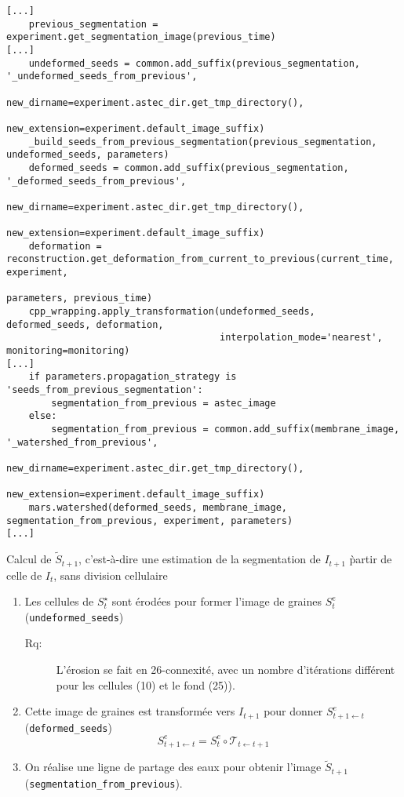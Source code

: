 \documentclass{article}
\def \mycolor {red}
\newenvironment{remarque}{\color{red}\begin{description}\item[Rq:]}
{\end{description}\color{black}}
\begin{document}
\color{black}
\begin{verbatim}
[...]
    previous_segmentation = experiment.get_segmentation_image(previous_time)
[...]
    undeformed_seeds = common.add_suffix(previous_segmentation, '_undeformed_seeds_from_previous',
                                         new_dirname=experiment.astec_dir.get_tmp_directory(),
                                         new_extension=experiment.default_image_suffix)
    _build_seeds_from_previous_segmentation(previous_segmentation, undeformed_seeds, parameters)
    deformed_seeds = common.add_suffix(previous_segmentation, '_deformed_seeds_from_previous',
                                       new_dirname=experiment.astec_dir.get_tmp_directory(),
                                       new_extension=experiment.default_image_suffix)
    deformation = reconstruction.get_deformation_from_current_to_previous(current_time, experiment,
                                                                          parameters, previous_time)
    cpp_wrapping.apply_transformation(undeformed_seeds, deformed_seeds, deformation,
                                      interpolation_mode='nearest', monitoring=monitoring)
[...]
    if parameters.propagation_strategy is 'seeds_from_previous_segmentation':
        segmentation_from_previous = astec_image
    else:
        segmentation_from_previous = common.add_suffix(membrane_image, '_watershed_from_previous',
                                                       new_dirname=experiment.astec_dir.get_tmp_directory(),
                                                       new_extension=experiment.default_image_suffix)
    mars.watershed(deformed_seeds, membrane_image, segmentation_from_previous, experiment, parameters)
[...]
\end{verbatim}
\color{\mycolor}
Calcul de $\tilde{S}_{t+1}$, c'est-\`a-dire une estimation de la segmentation de $I_{t+1}$ \` partir de celle de $I_{t}$, sans division cellulaire
\begin{enumerate}
\itemsep -0.5ex
\item Les cellules de $S^{\star}_{t}$ sont \'erod\'ees pour former l'image de graines $S^{e}_{t}$ (\verb|undeformed_seeds|)
\begin{remarque}
L'\'erosion se fait en 26-connexit\'e, avec un nombre d'it\'erations diff\'erent pour les cellules (10) et le fond (25)). 
\end{remarque}
\item Cette image de graines est transform\'ee vers $I_{t+1}$
pour donner $S^{e}_{t+1 \leftarrow t}$ (\verb|deformed_seeds|)
\begin{displaymath}
S^{e}_{t+1 \leftarrow t} = S^{e}_{t} \circ \mathcal{T}_{t \leftarrow t+1}
\end{displaymath}
\item On r\'ealise une ligne de partage des eaux pour obtenir l'image $\tilde{S}_{t+1}$ (\verb|segmentation_from_previous|). 
\end{enumerate}
\end{document}
